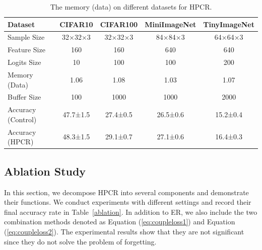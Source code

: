 \begin{table}[t]
\renewcommand\tabcolsep{2pt}
\centering
\caption{The memory (data) on different datasets for HPCR.}
\vspace{-2ex}
\label{table:memory}
\begin{tabular}{l|cccc}
\hline
Dataset       & CIFAR10      &CIFAR100  & MiniImageNet & TinyImageNet\\ \hline
Sample Size       & 32×32×3      & 32×32×3 & 84×84×3 & 64×64×3\\
Feature Size        & 160      & 160 & 640 & 640\\
Logits Size       & 10      & 100 & 100 & 200\\
Memory (Data)       & 1.06      & 1.08 & 1.03 & 1.07\\
Buffer Size     & 100      & 1000 & 1000 & 2000\\
Accuracy (Control)       & 47.7\scriptsize±1.5      & 27.4\scriptsize±0.5 & 26.5\scriptsize±0.6 & 15.2\scriptsize±0.4\\
Accuracy (HPCR)       & 48.3\scriptsize±1.5      & 29.1\scriptsize±0.7 & 27.1\scriptsize±0.6 & 16.4\scriptsize±0.3\\
\hline
\end{tabular}
\vspace{-4ex}
\end{table}

\subsection{Ablation Study}
In this section, we decompose HPCR into several components and demonstrate their functions. We conduct experiments with different settings and record their final accuracy rate in Table~\ref{ablation}. In addition to ER, we also include the two combination methods denoted as Equation (\ref{eq:coupleloss1}) and Equation (\ref{eq:coupleloss2}). The experimental results show that they are not significant since they do not solve the problem of forgetting.   



